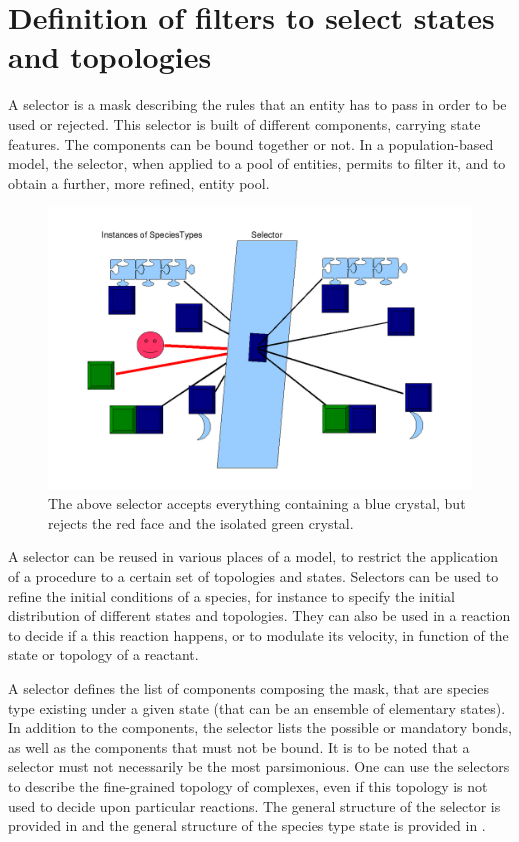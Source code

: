 \section{Definition of filters to select states and topologies }
 
A selector is a mask describing the rules that an entity has to pass in order to be used or rejected. This selector is built of different components, carrying state features. The components can be bound together or not. In a population-based model, the selector, when applied to a pool of entities, permits to filter it, and to obtain a further, more refined, entity pool.

\begin{figure}[H]
\begin{center}
\includegraphics[scale=0.3]{figs/pngs/PrincipleIdeaSelector.png} 
\caption{The above selector accepts everything containing a blue crystal, but rejects the red face and the isolated green crystal.}
\label{fig:PrincipleIdeaSelector}
\end{center}
\end{figure}

A selector can be reused in various places of a model, to restrict the application of a procedure to a certain set of topologies and states. Selectors can be used to refine the initial conditions of a species, for instance to specify the initial distribution of different states and topologies. They can also be used in a reaction to decide if a this reaction happens, or to modulate its velocity, in function of the state or topology of a reactant. 

A selector defines the list of components composing the mask, that are species type existing under a given state (that can be an ensemble of elementary states). In addition to the components, the selector lists the possible or mandatory bonds, as well as the components that must not be bound. It is to be noted that a selector must not necessarily be the most parsimonious. One can use the selectors to describe the fine-grained topology of complexes, even if this topology is not used to decide upon particular reactions. The general structure of the selector is provided in  and the general structure of the species type state is provided in .

